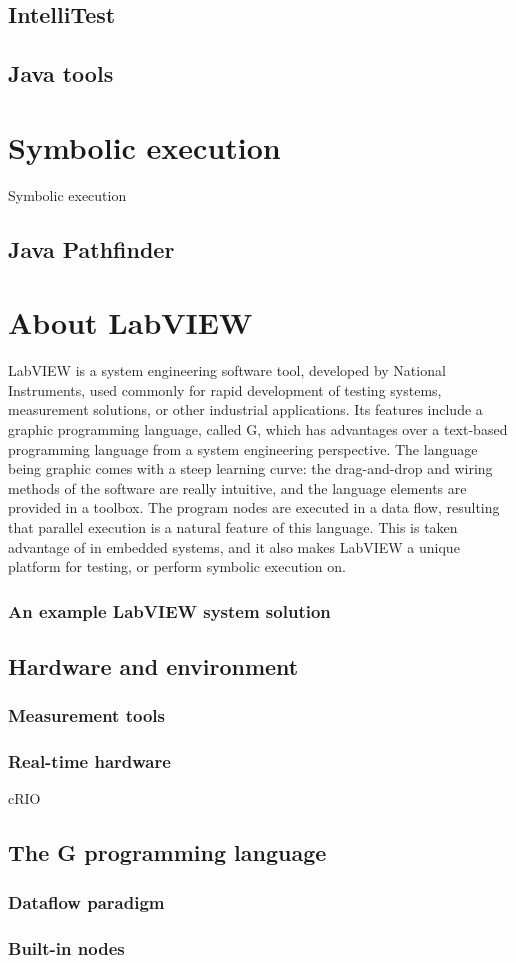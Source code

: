 \subsection{IntelliTest}
\subsection{Java tools}
\section{Symbolic execution}

Symbolic execution \cite{King:1976:SEP:360248.360252}
\subsection{Java Pathfinder}
\section{About LabVIEW}
LabVIEW is a system engineering software tool, developed by National Instruments, used commonly for rapid development of testing systems, measurement solutions, or other industrial applications. Its features include a graphic programming language, called G, which has advantages over a text-based programming language from a system engineering perspective. The language being graphic comes with a steep learning curve: the drag-and-drop and wiring methods of the software are really intuitive, and the language elements are provided in a toolbox. The program nodes are executed in a data flow, resulting that parallel execution is a natural feature of this language. This is taken advantage of in embedded systems, and it also makes LabVIEW a unique platform for testing, or perform symbolic execution on.
\subsubsection{An example LabVIEW system solution}

\subsection{Hardware and environment}
\subsubsection{Measurement tools}
\subsubsection{Real-time hardware}
cRIO
\subsection{The G programming language}
\subsubsection{Dataflow paradigm}
\subsubsection{Built-in nodes}
